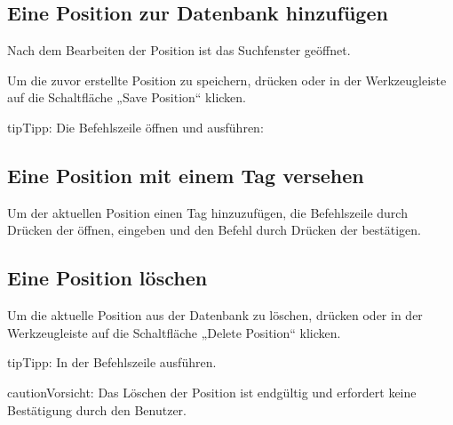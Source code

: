 \documentclass[letterpaper,10pt,german]{sphinxmanual}
\begin{document}
\subsection{Eine Position zur Datenbank hinzufügen}
\label{\detokenize{guide_utilisateur:ajouter-une-position-a-la-base-de-donnees}}
\sphinxAtStartPar
Nach dem Bearbeiten der Position ist das Suchfenster geöffnet.

\sphinxAtStartPar
Um die zuvor erstellte Position zu speichern,  drücken oder in der Werkzeugleiste auf die Schaltfläche „Save Position“ klicken.

\begin{sphinxadmonition}{tip}{Tipp:}
\sphinxAtStartPar
Die Befehlszeile öffnen und ausführen: 
\end{sphinxadmonition}


\subsection{Eine Position mit einem Tag versehen}
\label{\detokenize{guide_utilisateur:etiqueter-une-position}}
\sphinxAtStartPar
Um der aktuellen Position einen Tag  hinzuzufügen, die Befehlszeile durch Drücken der  öffnen,  eingeben und den Befehl durch Drücken der  bestätigen.


\subsection{Eine Position löschen}
\label{\detokenize{guide_utilisateur:supprimer-une-position}}
\sphinxAtStartPar
Um die aktuelle Position aus der Datenbank zu löschen,  drücken oder in der Werkzeugleiste auf die Schaltfläche „Delete Position“ klicken.

\begin{sphinxadmonition}{tip}{Tipp:}
\sphinxAtStartPar
In der Befehlszeile  ausführen.
\end{sphinxadmonition}

\begin{sphinxadmonition}{caution}{Vorsicht:}
\sphinxAtStartPar
Das Löschen der Position ist endgültig und erfordert keine Bestätigung durch den Benutzer.
\end{sphinxadmonition}
\end{document}
